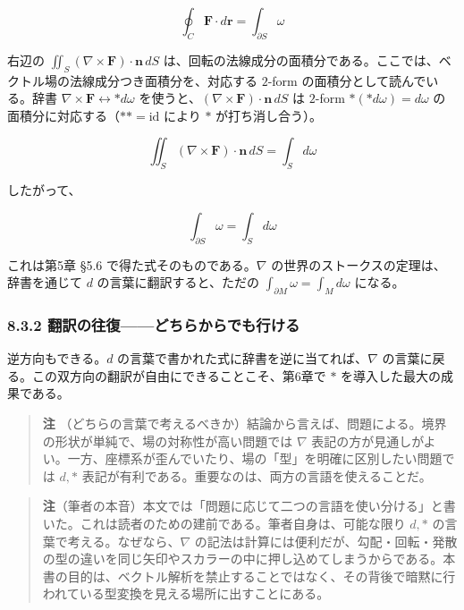 \documentclass[a4paper,12pt,openany]{book}
\begin{document}
\[\oint_C \mathbf{F} \cdot d\mathbf{r} = \int_{\partial S} \omega\]

右辺の \(\iint_S (\nabla\times\mathbf{F})\cdot\mathbf{n}\,dS\)
は、回転の法線成分の面積分である。ここでは、ベクトル場の法線成分つき面積分を、対応する
\(2\)-form の面積分として読んでいる。辞書
\(\nabla\times\mathbf{F} \leftrightarrow \ast d\omega\)
を使うと、\((\nabla\times\mathbf{F})\cdot\mathbf{n}\,dS\) は \(2\)-form
\(\ast(\ast d\omega) = d\omega\)
の面積分に対応する（\(\ast\ast = \mathrm{id}\) により \(\ast\)
が打ち消し合う）。

\[\iint_S (\nabla \times \mathbf{F}) \cdot \mathbf{n}\,dS = \int_S d\omega\]

したがって、

\[\int_{\partial S} \omega = \int_S d\omega\]

これは第5章 §5.6 で得た式そのものである。\(\nabla\)
の世界のストークスの定理は、辞書を通じて \(d\)
の言葉に翻訳すると、ただの \(\int_{\partial M}\omega = \int_M d\omega\)
になる。

\hypertarget{ux7ffbux8a33ux306eux5f80ux5fa9ux3069ux3061ux3089ux304bux3089ux3067ux3082ux884cux3051ux308b}{%
\subsubsection{8.3.2
翻訳の往復——どちらからでも行ける}\label{ux7ffbux8a33ux306eux5f80ux5fa9ux3069ux3061ux3089ux304bux3089ux3067ux3082ux884cux3051ux308b}}

逆方向もできる。\(d\) の言葉で書かれた式に辞書を逆に当てれば、\(\nabla\)
の言葉に戻る。この双方向の翻訳が自由にできることこそ、第6章で \(\ast\)
を導入した最大の成果である。

\begin{quote}
\textbf{注}
（どちらの言葉で考えるべきか）結論から言えば、問題による。境界の形状が単純で、場の対称性が高い問題では
\(\nabla\)
表記の方が見通しがよい。一方、座標系が歪んでいたり、場の「型」を明確に区別したい問題では
\(d,\ast\) 表記が有利である。重要なのは、両方の言語を使えることだ。
\end{quote}

\begin{quote}
\textbf{注}（筆者の本音）本文では「問題に応じて二つの言語を使い分ける」と書いた。これは読者のための建前である。筆者自身は、可能な限り
\(d,\ast\) の言葉で考える。なぜなら、\(\nabla\)
の記法は計算には便利だが、勾配・回転・発散の型の違いを同じ矢印やスカラーの中に押し込めてしまうからである。本書の目的は、ベクトル解析を禁止することではなく、その背後で暗黙に行われている型変換を見える場所に出すことにある。
\end{quote}
\end{document}
